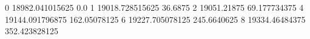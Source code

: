 0 18982.041015625 0.0
1 19018.728515625 36.6875
2 19051.21875 69.177734375
4 19144.091796875 162.05078125
6 19227.705078125 245.6640625
8 19334.46484375 352.423828125

